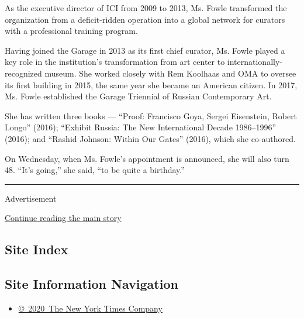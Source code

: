 As the executive director of ICI from 2009 to 2013, Ms. Fowle
transformed the organization from a deficit-ridden operation into a
global network for curators with a professional training program.

Having joined the Garage in 2013 as its first chief curator, Ms. Fowle
played a key role in the institution's transformation from art center to
internationally-recognized museum. She worked closely with Rem Koolhaas
and OMA to oversee its first building in 2015, the same year she became
an American citizen. In 2017, Ms. Fowle established the Garage Triennial
of Russian Contemporary Art.

She has written three books --- ``Proof: Francisco Goya, Sergei
Eisenstein, Robert Longo'' (2016); ``Exhibit Russia: The New
International Decade 1986--1996'' (2016); and ``Rashid Johnson: Within
Our Gates'' (2016), which she co-authored.

On Wednesday, when Ms. Fowle's appointment is announced, she will also
turn 48. ``It's going,'' she said, ``to be quite a birthday.''

\begin{center}\rule{0.5\linewidth}{\linethickness}\end{center}

Advertisement

\protect\hyperlink{after-bottom}{Continue reading the main story}

\hypertarget{site-index}{%
\subsection{Site Index}\label{site-index}}

\hypertarget{site-information-navigation}{%
\subsection{Site Information
Navigation}\label{site-information-navigation}}

\begin{itemize}
\tightlist
\item
  \href{https://help.nytimes3xbfgragh.onion/hc/en-us/articles/115014792127-Copyright-notice}{©~2020~The
  New York Times Company}
\end{itemize}

